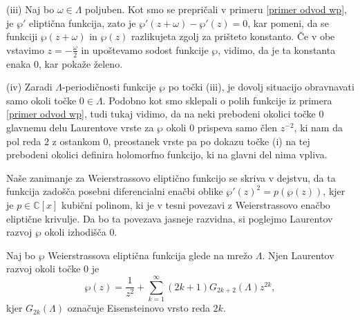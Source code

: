 \documentclass[mat1]{fmfdelo}
\numberwithin{equation}{section}
\newcommand{\C}{\mathbb C}
\newcommand{\om}{\omega}
\theoremstyle{definition}
\begin{document}
\begin{dokaz}
    (iii) Naj bo $\om\in \Lambda$ poljuben. Kot smo se prepričali v primeru \ref{primer odvod wp}, je $\wp'$ eliptična funkcija, zato je $\wp'(z + \om) - \wp'(z) = 0$, kar pomeni, da se funkciji $\wp(z + \om)$ in $\wp(z)$ razlikujeta zgolj za prišteto konstanto. Če v obe vstavimo $z = -\frac{\omega}{2}$ in upoštevamo sodost funkcije $\wp$, vidimo, da je ta konstanta enaka $0$, kar pokaže želeno.

    (iv) Zaradi $\Lambda$-periodičnosti funkcije $\wp$ po točki (iii), je dovolj situacijo obravnavati samo okoli točke $0\in\Lambda$. Podobno kot smo sklepali o polih funkcije iz primera \ref{primer odvod wp}, tudi tukaj vidimo, da na neki prebodeni okolici točke $0$ glavnemu delu Laurentove vrste za $\wp$ okoli $0$ prispeva samo člen $z^{-2}$, ki nam da pol reda $2$ z ostankom $0$, preostanek vrste pa po dokazu točke (i) na tej prebodeni okolici definira holomorfno funkcijo, ki na glavni del nima vpliva.  
\end{dokaz}

Naše zanimanje za Weierstrassovo eliptično funkcijo se skriva v dejstvu, da ta funkcija zadošča posebni diferencialni enačbi oblike $\wp'(z)^2 = p(\wp(z))$, kjer je $p \in \C[x]$ kubični polinom, ki je v tesni povezavi z Weierstrassovo enačbo eliptične krivulje. Da bo ta povezava jasneje razvidna, si poglejmo Laurentov razvoj $\wp$ okoli izhodišča $0$. 

\begin{lema}
    Naj bo $\wp$ Weierstrassova eliptična funkcija glede na mrežo $\Lambda$. Njen Laurentov razvoj okoli točke $0$ je
    \[
        \wp(z) = \frac{1}{z^2} + \sum_{k = 1}^\infty(2k + 1)G_{2k + 2}(\Lambda)z^{2k},  
    \]
    kjer $G_{2k}(\Lambda)$ označuje Eisensteinovo vrsto reda $2k$.
\end{lema}
\end{document}
